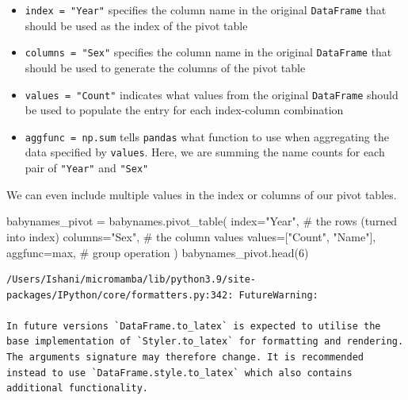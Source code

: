\documentclass[
  letterpaper,
  DIV=11,
  numbers=noendperiod]{scrreprt}
\newenvironment{Shaded}{\begin{snugshade}}{\end{snugshade}}
\newcommand{\BuiltInTok}[1]{\textcolor[rgb]{0.00,0.23,0.31}{#1}}
\newcommand{\CommentTok}[1]{\textcolor[rgb]{0.37,0.37,0.37}{#1}}
\newcommand{\DecValTok}[1]{\textcolor[rgb]{0.68,0.00,0.00}{#1}}
\newcommand{\NormalTok}[1]{\textcolor[rgb]{0.00,0.23,0.31}{#1}}
\newcommand{\OperatorTok}[1]{\textcolor[rgb]{0.37,0.37,0.37}{#1}}
\newcommand{\StringTok}[1]{\textcolor[rgb]{0.13,0.47,0.30}{#1}}
\providecommand{\tightlist}{%
  \setlength{\itemsep}{0pt}\setlength{\parskip}{0pt}}\usepackage{longtable,booktabs,array}
\begin{document}
\begin{itemize}
\tightlist
\item
  \texttt{index\ =\ "Year"} specifies the column name in the original
  \texttt{DataFrame} that should be used as the index of the pivot table
\item
  \texttt{columns\ =\ "Sex"} specifies the column name in the original
  \texttt{DataFrame} that should be used to generate the columns of the
  pivot table
\item
  \texttt{values\ =\ "Count"} indicates what values from the original
  \texttt{DataFrame} should be used to populate the entry for each
  index-column combination
\item
  \texttt{aggfunc\ =\ np.sum} tells \texttt{pandas} what function to use
  when aggregating the data specified by \texttt{values}. Here, we are
  summing the name counts for each pair of \texttt{"Year"} and
  \texttt{"Sex"}
\end{itemize}

We can even include multiple values in the index or columns of our pivot
tables.

\begin{Shaded}
\begin{Highlighting}[]
\NormalTok{babynames\_pivot }\OperatorTok{=}\NormalTok{ babynames.pivot\_table(}
\NormalTok{    index}\OperatorTok{=}\StringTok{"Year"}\NormalTok{,     }\CommentTok{\# the rows (turned into index)}
\NormalTok{    columns}\OperatorTok{=}\StringTok{"Sex"}\NormalTok{,    }\CommentTok{\# the column values}
\NormalTok{    values}\OperatorTok{=}\NormalTok{[}\StringTok{"Count"}\NormalTok{, }\StringTok{"Name"}\NormalTok{], }
\NormalTok{    aggfunc}\OperatorTok{=}\BuiltInTok{max}\NormalTok{,      }\CommentTok{\# group operation}
\NormalTok{)}
\NormalTok{babynames\_pivot.head(}\DecValTok{6}\NormalTok{)}
\end{Highlighting}
\end{Shaded}

\begin{verbatim}
/Users/Ishani/micromamba/lib/python3.9/site-packages/IPython/core/formatters.py:342: FutureWarning:

In future versions `DataFrame.to_latex` is expected to utilise the base implementation of `Styler.to_latex` for formatting and rendering. The arguments signature may therefore change. It is recommended instead to use `DataFrame.style.to_latex` which also contains additional functionality.
\end{verbatim}
\end{document}

